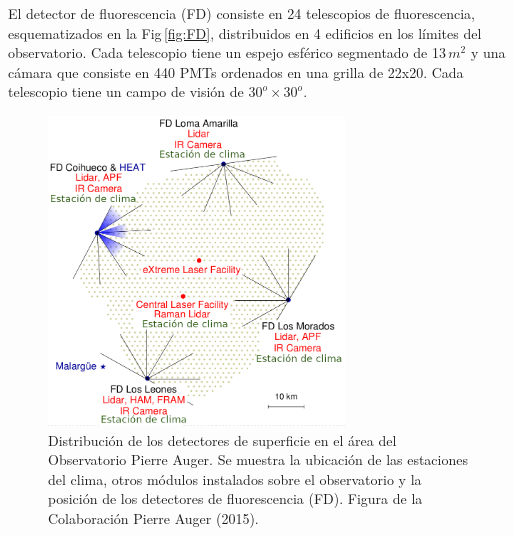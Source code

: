 El detector de fluorescencia (FD) consiste en 24 telescopios de fluorescencia, esquematizados en la Fig\,\ref{fig:FD}, distribuidos en 4 edificios en los límites del observatorio. Cada telescopio tiene un espejo esférico segmentado de 13$\,m^2$ y una cámara que consiste en 440 PMTs ordenados en una grilla de 22x20. Cada telescopio tiene un campo de visión de $30^o\times30^o$.

\begin{figure}[H]
	\centering
	\includegraphics[width=0.7\textwidth]{auger_sd.png}
	\caption{Distribución de los detectores de superficie en el área del Observatorio Pierre Auger. Se muestra la ubicación de las estaciones del clima, otros módulos instalados sobre el observatorio y la posición de los detectores de fluorescencia (FD). Figura de la Colaboración Pierre Auger (2015).}
	\label{fig:auger_sd}
\end{figure}
